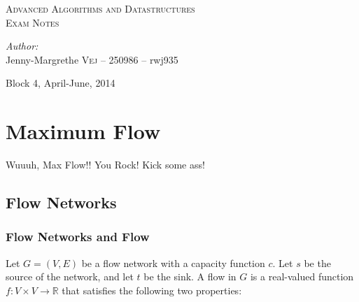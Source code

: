 \documentclass[12pt,a4paper]{article}
\begin{document}
\begin{titlepage}

\centering 

\textsc{\Large Advanced Algorithms and Datastructures}\\[0.5cm] 
\textsc{\large Exam Notes}\\[0.5cm] 

\vfill

\emph{Author:}
\\
Jenny-Margrethe \textsc{Vej} -- 250986 -- rwj935
\vspace{20mm}

{\large Block 4, April-June, 2014}\\[3cm] 

\end{titlepage}

\tableofcontents
\newpage


\section{Maximum Flow}
Wuuuh, Max Flow!! You Rock! Kick some ass!

\subsection{Flow Networks}
\subsubsection{Flow Networks and Flow}
Let $G = (V, E)$ be a flow network with a capacity function $c$. Let $s$ be the source of the network, and let $t$ be the sink. A flow in $G$ is a real-valued function $f : V \times V \rightarrow \mathbb{R}$ that satisfies the following two properties:\\
\end{document}
